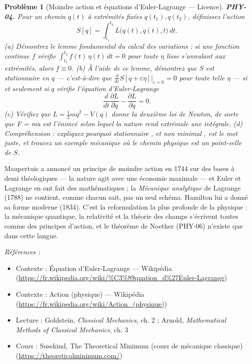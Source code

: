 \documentclass[11pt]{article}
\newtheorem{problem}{Problème}
\newenvironment{refs}{\par\small\noindent\emph{Références :}\begin{itemize}\setlength\itemsep{0pt}}{\end{itemize}\normalsize}
\begin{document}
\bigskip

\begin{problem}[{Moindre action et équations d'Euler-Lagrange --- Licence}]
\textbf{PHY-04.} Pour un chemin $q(t)$ à extrémités fixées
$q(t_1), q(t_2)$, définissez l'action
\[ S[q] = \int_{t_1}^{t_2} L\bigl(q(t), \dot q(t), t\bigr)\,dt. \]
(a) Démontrez le lemme fondamental du calcul des variations : si une fonction continue $f$
vérifie $\int_{t_1}^{t_2} f(t)\,\eta(t)\,dt = 0$ pour toute $\eta$ lisse s'annulant aux
extrémités, alors $f \equiv 0$. (b) À l'aide de ce lemme, démontrez que $S$ est stationnaire
en $q$ --- c'est-à-dire que
$\frac{d}{d\varepsilon}S[q + \varepsilon\eta]\big|_{\varepsilon=0} = 0$ pour toute telle
$\eta$ --- si et seulement si $q$ vérifie l'équation d'Euler-Lagrange
\[ \frac{d}{dt}\frac{\partial L}{\partial \dot q} - \frac{\partial L}{\partial q} = 0. \]
(c) Vérifiez que $L = \tfrac12 m\dot q^2 - V(q)$ donne la deuxième loi de Newton, de sorte que
\og{} F = ma \fg{} est l'énoncé selon lequel la nature rend extrémale une intégrale. (d) Compréhension :
expliquez pourquoi \og{} stationnaire \fg{}, et non \og{} minimal \fg{}, est le mot juste, et trouvez un exemple
mécanique où le chemin physique est un point-selle de $S$.
\end{problem}

\noindent Maupertuis a annoncé un \og{} principe de moindre action \fg{} en 1744 sur des bases
à demi théologiques --- la nature agit avec une économie maximale --- et Euler et Lagrange en ont
fait des mathématiques ; la \textit{Mécanique analytique} de Lagrange (1788) ne contient, comme
chacun sait, pas un seul schéma. Hamilton lui a donné sa forme moderne (1834). C'est la
reformulation la plus profonde de la physique : la mécanique quantique, la relativité et la
théorie des champs s'écrivent toutes comme des principes d'action, et le théorème de Noether
(PHY-06) n'existe que dans cette langue.

\begin{refs}
\item Contexte : Équation d'Euler-Lagrange --- Wikipédia (\url{https://fr.wikipedia.org/wiki/%C3%89quation_d%27Euler-Lagrange})
\item Contexte : Action (physique) --- Wikipédia (\url{https://fr.wikipedia.org/wiki/Action_(physique)})
\item Lecture : Goldstein, \textit{Classical Mechanics}, ch. 2 ; Arnold, \textit{Mathematical Methods of Classical Mechanics}, ch. 3
\item Cours : Susskind, The Theoretical Minimum (cours de mécanique classique) (\url{https://theoreticalminimum.com/})
\end{refs}
\end{document}
